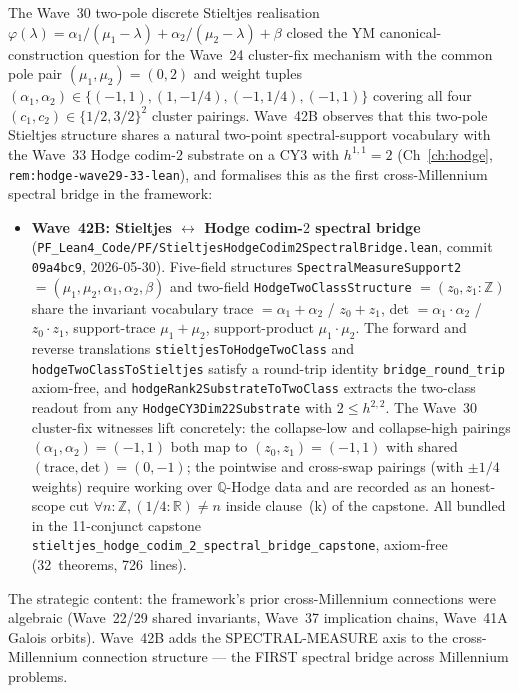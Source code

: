 \begin{remark}\label{rem:ym-wave42-lean}
The Wave~30 two-pole discrete Stieltjes realisation $\varphi(\lambda) = \alpha_1/(\mu_1 - \lambda) + \alpha_2/(\mu_2 - \lambda) + \beta$ closed the YM canonical-construction question for the Wave~24 cluster-fix mechanism with the common pole pair $(\mu_1, \mu_2) = (0, 2)$ and weight tuples $(\alpha_1, \alpha_2) \in \{(-1, 1), (1, -1/4), (-1, 1/4), (-1, 1)\}$ covering all four $(c_1, c_2) \in \{1/2, 3/2\}^2$ cluster pairings. Wave~42B observes that this two-pole Stieltjes structure shares a natural two-point spectral-support vocabulary with the Wave~33 Hodge codim-$2$ substrate on a CY$3$ with $h^{1,1} = 2$ (Ch~\ref{ch:hodge}, \texttt{rem:hodge-wave29-33-lean}), and formalises this as the first cross-Millennium spectral bridge in the framework:
\begin{itemize}
  \item \textbf{Wave~42B: Stieltjes $\leftrightarrow$ Hodge codim-$2$ spectral bridge} (\texttt{PF\_Lean4\_Code/PF/StieltjesHodgeCodim2SpectralBridge.lean}, commit \texttt{09a4bc9}, 2026-05-30). Five-field structures \texttt{SpectralMeasureSupport2} $= (\mu_1, \mu_2, \alpha_1, \alpha_2, \beta)$ and two-field \texttt{HodgeTwoClassStructure} $= (z_0, z_1 : \mathbb{Z})$ share the invariant vocabulary trace $= \alpha_1 + \alpha_2$ / $z_0 + z_1$, det $= \alpha_1 \cdot \alpha_2$ / $z_0 \cdot z_1$, support-trace $\mu_1 + \mu_2$, support-product $\mu_1 \cdot \mu_2$. The forward and reverse translations \texttt{stieltjesToHodgeTwoClass} and \texttt{hodgeTwoClassToStieltjes} satisfy a round-trip identity \texttt{bridge\_round\_trip} axiom-free, and \texttt{hodgeRank2SubstrateToTwoClass} extracts the two-class readout from any \texttt{HodgeCY3Dim22Substrate} with $2 \leq h^{2,2}$. The Wave~30 cluster-fix witnesses lift concretely: the collapse-low and collapse-high pairings $(\alpha_1, \alpha_2) = (-1, 1)$ both map to $(z_0, z_1) = (-1, 1)$ with shared $(\mathrm{trace}, \mathrm{det}) = (0, -1)$; the pointwise and cross-swap pairings (with $\pm 1/4$ weights) require working over $\mathbb{Q}$-Hodge data and are recorded as an honest-scope cut $\forall n : \mathbb{Z}, (1/4 : \mathbb{R}) \neq n$ inside clause~(k) of the capstone. All bundled in the 11-conjunct capstone \texttt{stieltjes\_hodge\_codim\_2\_spectral\_bridge\_capstone}, axiom-free (32~theorems, 726~lines).
\end{itemize}
The strategic content: the framework's prior cross-Millennium connections were algebraic (Wave~22/29 shared invariants, Wave~37 implication chains, Wave~41A Galois orbits). Wave~42B adds the SPECTRAL-MEASURE axis to the cross-Millennium connection structure --- the FIRST spectral bridge across Millennium problems.


\end{remark}
